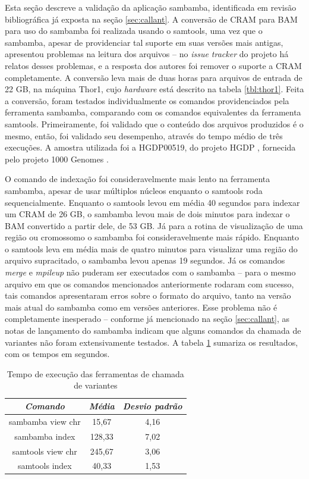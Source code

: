 \documentclass[cic,tc]{iiufrgs}
\begin{document}
Esta seção descreve a validação da aplicação sambamba, identificada em revisão
bibliográfica já exposta na seção \ref{sec:callant}. A conversão de CRAM para
BAM para uso do sambamba foi realizada usando o samtools, uma vez que o
sambamba, apesar de providenciar tal suporte em suas versões mais antigas,
apresentou problemas na leitura dos arquivos -- no \textit{issue tracker} do
projeto há relatos desses problemas, e a resposta dos autores foi remover o
suporte a CRAM completamente. A conversão leva mais de duas horas para arquivos
de entrada de 22 GB, na máquina Thor1, cujo \textit{hardware} está descrito na
tabela \ref{tbl:thor1}. Feita a conversão, foram testados individualmente os
comandos providenciados pela ferramenta sambamba, comparando com os comandos
equivalentes da ferramenta samtools.  Primeiramente, foi validado que o
conteúdo dos arquivos produzidos é o mesmo, então, foi validado seu desempenho,
através do tempo médio de três execuções. A amostra utilizada foi a HGDP00519,
do projeto HGDP \cite{cavalli2005human}, fornecida pelo projeto 1000 Genomes
\cite{via20101000}.

O comando de indexação foi consideravelmente mais lento na ferramenta sambamba,
apesar de usar múltiplos núcleos enquanto o samtools roda sequencialmente.
Enquanto o samtools levou em média 40 segundos para indexar um CRAM de 26 GB, o
sambamba levou mais de dois minutos para indexar o BAM convertido a partir
dele, de 53 GB. Já para a rotina de visualização de uma região ou cromossomo o
sambamba foi consideravelmente mais rápido. Enquanto o samtools leva em média
mais de quatro minutos para visualizar uma região do arquivo supracitado, o
sambamba levou apenas 19 segundos. Já os comandos \textit{merge} e
\textit{mpileup} não puderam ser executados com o sambamba -- para o mesmo
arquivo em que os comandos mencionados anteriormente rodaram com sucesso, tais
comandos apresentaram erros sobre o formato do arquivo, tanto na versão mais
atual do sambamba como em versões anteriores. Esse problema não é completamente
inesperado -- conforme já mencionado na seção \ref{sec:callant}, as notas de
lançamento do sambamba indicam que alguns comandos da chamada de variantes não
foram extensivamente testados. A tabela \ref{tbl:sambamba} sumariza os
resultados, com os tempos em segundos.

\begin{table}[h]
    \caption{Tempo de execução das ferramentas de chamada de variantes}
    \centering
        \begin{tabular}{c|c|c}
          \hline
          \textit{Comando}  &   \textit{Média}  & \textit{Desvio padrão} \\
          \hline
          \hline
          sambamba view chr & 15,67  & 4,16 \\
          sambamba index    & 128,33 & 7,02 \\
          samtools view chr & 245,67 & 3,06 \\
          samtools index    & 40,33  & 1,53 \\
          \hline
        \end{tabular}
    \label{tbl:sambamba}
\end{table}
\end{document}
